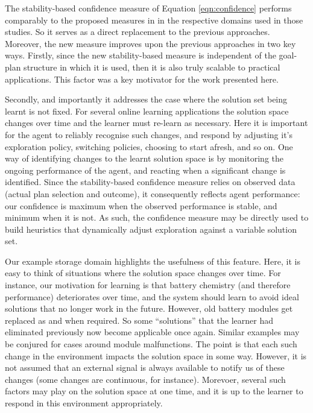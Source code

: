 The stability-based confidence measure of Equation \ref{eqn:confidence} performs comparably to the proposed measures in \cite{singh10:learning,singh10:extending} in the respective domains used in those studies. So it serves as a direct replacement to the previous approaches. Moreover, the new measure improves upon the previous approaches in two key ways. Firstly, since the new stability-based measure is independent of the goal-plan structure in which it is used, then it is also truly scalable to practical applications. This factor was a key motivator for the work presented here.

Secondly, and importantly it addresses the case where the solution set being learnt is not fixed. For several online learning applications the solution space changes over time and the learner must re-learn as necessary. Here it is important for the agent to reliably recognise such changes, and respond by adjusting it's exploration policy, switching policies, choosing to start afresh, and so on. One way of identifying changes to the learnt solution space is by monitoring the ongoing performance of the agent, and reacting when a significant change is identified. Since the stability-based confidence measure relies on observed data (actual plan selection and outcome), it consequently reflects agent performance: our confidence is maximum when the observed performance is stable, and minimum when it is not. As such, the confidence measure may be directly used to build heuristics that dynamically adjust exploration against a variable solution set.

Our example storage domain highlights the usefulness of this feature. Here, it is easy to think of situations where the solution space changes over time. For instance, our motivation for learning is that battery chemistry (and therefore performance) deteriorates over time, and the system should learn to avoid ideal solutions that no longer work in the future. However, old battery modules get replaced as and when required. So some ``solutions'' that the learner had eliminated previously now become applicable once again. Similar examples may be conjured for cases around module malfunctions. The point is that each such change in the environment impacts the solution space in some way. However, it is not assumed that an external signal is always available to notify us of these changes (some changes are continuous, for instance). Morevoer, several such factors may play on the solution space at one time, and it is up to the learner to respond in this environment appropriately.

